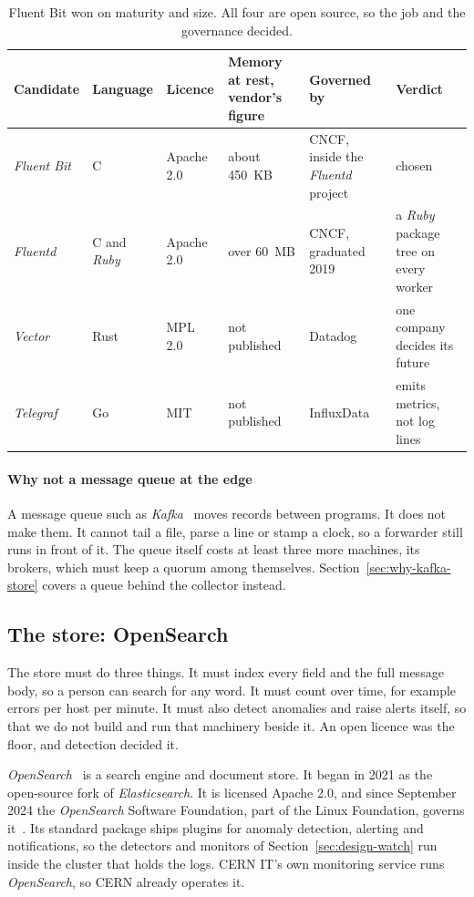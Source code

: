 \begin{table}[htbp]\caption{Fluent Bit won on maturity and size. All four are open source, so the job and the governance decided.}\label{tab:collectors}\centering\footnotesize
\begin{tabularx}{\textwidth}{l l l L{2.5cm} L{2.3cm} Y}
\toprule
Candidate & Language & Licence & Memory at rest, vendor's figure & Governed by & Verdict \\
\midrule
\textit{Fluent Bit} & C & Apache 2.0 & about 450~KB & CNCF, inside the \textit{Fluentd} project & chosen \\
\textit{Fluentd} & C and \textit{Ruby} & Apache 2.0 & over 60~MB & CNCF, graduated 2019 & a \textit{Ruby} package tree on every worker \\
\textit{Vector} & Rust & MPL 2.0 & not published & Datadog & one company decides its future \\
\textit{Telegraf} & Go & MIT & not published & InfluxData & emits metrics, not log lines \\
\bottomrule
\end{tabularx}
\end{table}

\paragraph{Why not a message queue at the edge}
A message queue such as \textit{Kafka}~\cite{ref:kafka} moves records between programs. It does not make them. It cannot tail a file, parse a line or stamp a clock, so a forwarder still runs in front of it. The queue itself costs at least three more machines, its brokers, which must keep a quorum among themselves. Section~\ref{sec:why-kafka-store} covers a queue behind the collector instead.

\subsection{The store: OpenSearch}\label{sec:why-store}

The store must do three things. It must index every field and the full message body, so a person can search for any word. It must count over time, for example errors per host per minute. It must also detect anomalies and raise alerts itself, so that we do not build and run that machinery beside it. An open licence was the floor, and detection decided it.

\textit{OpenSearch}~\cite{ref:opensearch} is a search engine and document store. It began in 2021 as the open-source fork of \textit{Elasticsearch}. It is licensed Apache 2.0, and since September 2024 the \textit{OpenSearch} Software Foundation, part of the Linux Foundation, governs it~\cite{ref:osf}. Its standard package ships plugins for anomaly detection, alerting and notifications, so the detectors and monitors of Section~\ref{sec:design-watch} run inside the cluster that holds the logs. CERN IT's own monitoring service runs \textit{OpenSearch}, so CERN already operates it.

